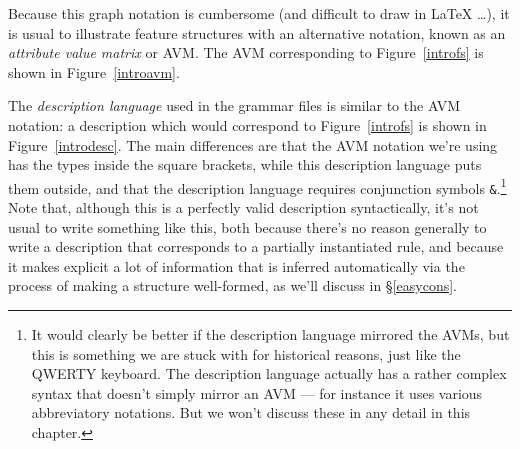 \documentclass[12pt]{report}
\newcommand{\newterm}[1]{{\it #1}}
\begin{document}
Because this graph notation is cumbersome (and difficult to draw in
LaTeX \ldots),
it is usual to illustrate feature structures with an alternative notation,
known as an \newterm{attribute value matrix} or AVM.  The AVM
corresponding to Figure~\ref{introfs} is shown in Figure~\ref{introavm}.

The \newterm{description language} used in the grammar files is
similar to the AVM notation: a description which would correspond to
Figure~\ref{introfs} is shown in Figure~\ref{introdesc}.  
The main differences are that the AVM notation we're using
has the types inside the square brackets, while this description language
puts them outside, and that the description language requires
conjunction symbols \verb+&+.\footnote{It would clearly be better if the
description language mirrored the AVMs, but this is something 
we are stuck with for historical reasons, just like the QWERTY keyboard.
The description language actually has a rather complex syntax 
that doesn't simply mirror an AVM --- for instance it uses
various abbreviatory notations.  But we won't discuss these in any
detail in this chapter.}
Note that, although this is a perfectly valid description syntactically,
it's not usual to write something like this, both because
there's no reason generally to write a description that corresponds
to a partially instantiated rule, and because
it makes explicit a lot of 
information that is inferred automatically via the
process of making a structure well-formed, as we'll discuss in \S\ref{easycons}.
\end{document}
